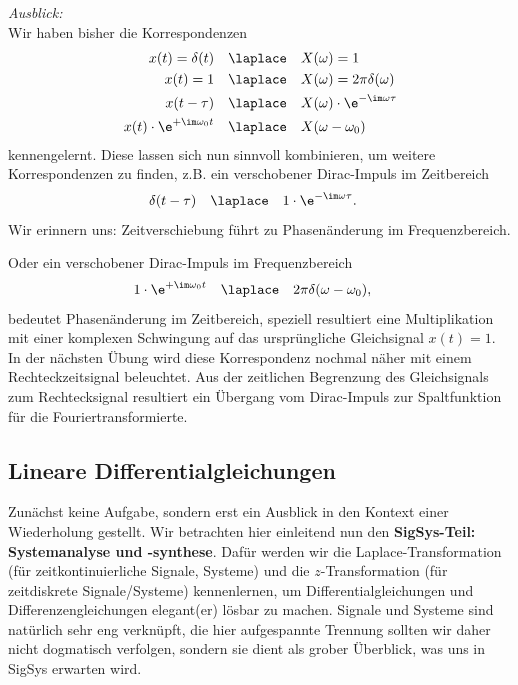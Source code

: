 \begin{mdframed}
\textit{Ausblick:}
%
\\\noindent
Wir haben bisher die Korrespondenzen
\begin{align}
x(t)= \delta(t) &\quad \laplace \quad X(\omega)=1\\
x(t)= 1 &\quad \laplace \quad X(\omega)=2\pi \delta(\omega)\\
x(t - \tau) & \quad \laplace \quad X(\omega) \cdot \e^{-\im\omega \tau}\\
x(t) \cdot \e^{+\im\omega_0 t} & \quad \laplace \quad X(\omega-\omega_0)
\end{align}
kennengelernt.
%
Diese lassen sich nun sinnvoll kombinieren, um weitere Korrespondenzen zu finden,
z.B. ein verschobener Dirac-Impuls im Zeitbereich
\begin{align}
\delta(t-\tau)& \quad \laplace \quad 1 \cdot \e^{-\im\omega \tau}.
\end{align}
Wir erinnern uns: Zeitverschiebung führt zu Phasenänderung im Frequenzbereich.

Oder ein verschobener Dirac-Impuls im Frequenzbereich
\begin{align}
1 \cdot \e^{+\im\omega_0 t} & \quad \laplace \quad 2\pi\delta(\omega-\omega_0),
\end{align}
bedeutet Phasenänderung im Zeitbereich, speziell resultiert eine Multiplikation
mit einer komplexen Schwingung auf das ursprüngliche Gleichsignal $x(t)=1$.
%
In der nächsten Übung wird diese Korrespondenz nochmal näher mit einem
Rechteckzeitsignal beleuchtet. Aus der zeitlichen Begrenzung des Gleichsignals
zum Rechtecksignal resultiert ein Übergang vom Dirac-Impuls zur Spaltfunktion
für die Fouriertransformierte.
\end{mdframed}














\newpage
\subsection{Lineare Differentialgleichungen}
\label{sec:A7BEE9E24E}
%
Zunächst keine Aufgabe, sondern erst ein Ausblick in den Kontext einer Wiederholung
gestellt.
Wir betrachten hier einleitend nun den \textbf{SigSys-Teil: Systemanalyse und -synthese}.
Dafür werden wir die Laplace-Transformation (für zeitkontinuierliche Signale, Systeme)
und die $z$-Transformation (für zeitdiskrete Signale/Systeme) kennenlernen, um
Differentialgleichungen und Differenzengleichungen elegant(er) lösbar zu machen.
%
Signale und Systeme sind natürlich sehr eng verknüpft, die hier aufgespannte
Trennung sollten wir daher nicht dogmatisch verfolgen, sondern sie dient als grober
Überblick, was uns in SigSys erwarten wird.

